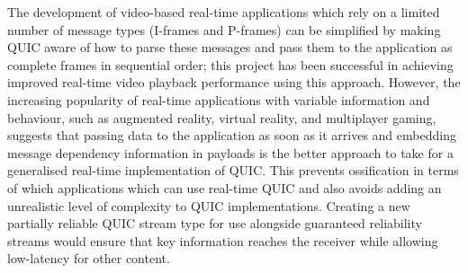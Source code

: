 \documentclass{mpaper}
\begin{document}
The development of video-based real-time applications which rely on a limited number of message types (I-frames and P-frames) can be simplified by making QUIC aware of how to parse these messages and pass them to the application as complete frames in sequential order; this project has been successful in achieving improved real-time video playback performance using this approach. However, the increasing popularity of real-time applications with variable information and behaviour, such as augmented reality, virtual reality, and multiplayer gaming, suggests that passing data to the application as soon as it arrives and embedding message dependency information in payloads is the better approach to take for a generalised real-time implementation of QUIC. This prevents ossification in terms of which applications which can use real-time QUIC and also avoids adding an unrealistic level of complexity to QUIC implementations. Creating a new partially reliable QUIC stream type for use alongside guaranteed reliability streams would ensure that key information reaches the receiver while allowing low-latency for other content.

\end{document}
